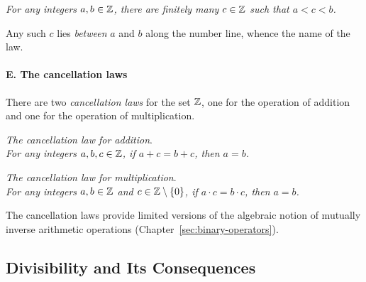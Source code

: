 \smallskip

\noindent
{\it For any integers $a, b \in \mathbb{Z}$, there are finitely many $c \in
  \mathbb{Z}$ such that $a < c < b$.}

\smallskip

\noindent
Any such $c$ lies {\em between} $a$ and $b$ along the number
line, whence the name of the law.

\paragraph{\small\sf E. The cancellation laws}

There are two {\it cancellation laws} for the set $\mathbb{Z}$,
 one for the operation of addition
and one for the operation of multiplication.

\medskip

\noindent
{\it The cancellation law for addition}. \\
%
{\it For any integers $a, b, c \in \mathbb{Z}$, if $a+c = b+c$, then $a = b$.}

\smallskip

\noindent
{\it The cancellation law for multiplication}. \\
%
{\it For any integers $a, b \in \mathbb{Z}$ and $c \in \mathbb{Z} \setminus \{0\}$, if
  $a \cdot c = b \cdot c$, then $a = b$.}

\smallskip

\noindent
The cancellation laws provide limited versions of the algebraic notion
of mutually inverse arithmetic operations
(Chapter~\ref{sec:binary-operators}).

\subsection{Divisibility and Its Consequences}
\label{sec:divisibility}

